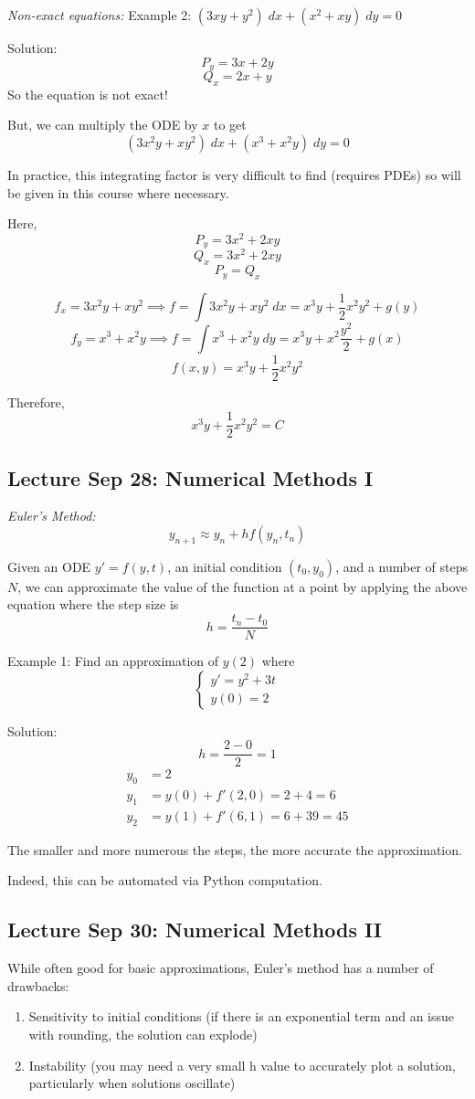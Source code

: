 \documentclass[12pt]{article}
\begin{document}
\emph{Non-exact equations:}
Example 2: $(3xy + y^2) \; dx + (x^2 + xy) \; dy = 0$

Solution:
\[P_y = 3x + 2y\]
\[Q_x = 2x + y\]
So the equation is not exact!

But, we can multiply the ODE by $x$ to get 
\[(3x^2 y + xy^2) \; dx + (x^3 + x^2 y) \; dy = 0\]

In practice, this integrating factor is very difficult to find (requires PDEs) so will be given in this course where necessary. 

Here,
\[P_y = 3x^2 + 2xy\]
\[Q_x = 3x^2 + 2xy\]
\[P_y = Q_x\]

\[f_x = 3x^2 y + xy^2 \implies f = \int 3x^2 y + xy^2 \; dx = x^3 y + \frac{1}{2}x^2 y^2 + g(y)\]
\[f_y = x^3 + x^2 y \implies f = \int x^3 + x^2 y \; dy = x^3 y + x^2 \frac{y^2}{2} + g(x)\]
\[f(x, y) = x^3 y + \frac{1}{2}x^2 y^2\]

Therefore, 
\[\boxed{x^3 y + \frac{1}{2}x^2 y^2 = C}\]

\subsection*{Lecture Sep 28: Numerical Methods I}
\emph{Euler's Method:}
\[y_{n + 1} \approx y_n + h f(y_n, t_n)\]

Given an ODE $y' = f(y, t)$, an initial condition $(t_0, y_0)$, and a number of steps $N$, we can approximate the value of the function at a point by applying the above equation where the step size is  
\[h = \frac{t_n - t_0}{N}\] 

Example 1: Find an approximation of $y(2)$ where 
\[\begin{cases}
    y' = y^2 + 3t\\
    y(0) = 2
\end{cases}\]

Solution:
\[h = \frac{2 - 0}{2} = 1\]
\begin{align*}
    y_0 &= 2\\
    y_1 &= y(0) + f'(2, 0) = 2 + 4 = 6\\
    y_2 &= y(1) + f'(6, 1) = 6 + 39 = 45
\end{align*}

The smaller and more numerous the steps, the more accurate the approximation. 

Indeed, this can be automated via Python computation. 

\subsection*{Lecture Sep 30: Numerical Methods II}
While often good for basic approximations, Euler's method has a number of drawbacks:
\begin{enumerate}
    \item Sensitivity to initial conditions (if there is an exponential term and an issue with rounding, the solution can explode)
    \item Instability (you may need a very small h value to accurately plot a solution, particularly when solutions oscillate)
\end{enumerate}
\end{document}
